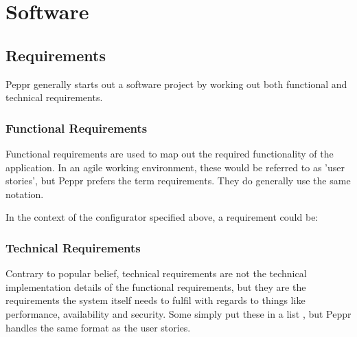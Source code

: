\section{Software}

\subsection{Requirements}
Peppr generally starts out a software project by working out both functional and technical requirements.

\subsubsection{Functional Requirements}
Functional requirements are used to map out the required functionality of the application. In an agile \cite{Agile: User Stories} working environment, these would be referred to as 'user stories', but Peppr prefers the term requirements. They do generally use the same notation.\newline

\newline

In the context of the configurator specified above, a requirement could be: \newline

\newline

\subsubsection{Technical Requirements}
Contrary to popular belief, technical requirements are not the technical implementation details of the functional requirements, but they are the requirements the system itself needs to fulfil with regards to things like performance, availability and security. Some simply put these in a list \cite{Agile: Technical Requirements}, but Peppr handles the same format as the user stories.\newline

